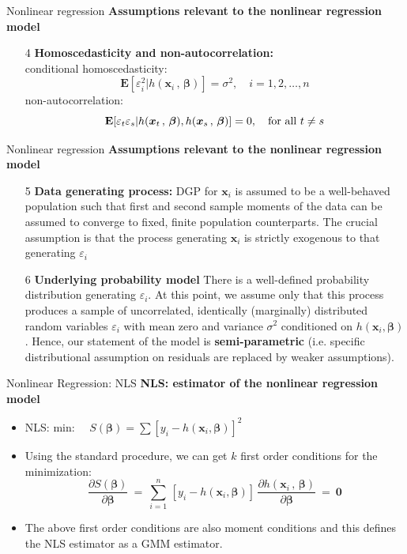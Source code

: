 \documentclass{beamer}
\begin{document}
\begin{frame}{Nonlinear regression}
\textbf{Assumptions relevant to the nonlinear regression model}\\
\medskip
\begin{itemize}
 \item[4] \textbf{Homoscedasticity and non-autocorrelation:}\\
 \medskip
 conditional homoscedasticity:
 $$
 \mathbf{E}[\varepsilon_i^2| h(\bm{x}_i\, , \,\bm{\beta})] = \sigma^2, \quad i=1,2,\dots,n
 $$
 non-autocorrelation:
 $$
 \mathbf{E}[\varepsilon_t\varepsilon_s| h(\bm{x}_t\, , \,\bm{\beta}), h(\bm{x}_s\, , \,\bm{\beta})] = 0, \quad \textnormal{for all~}t\neq s
 $$
\end{itemize}
\end{frame}
\begin{frame}{Nonlinear regression}
\textbf{Assumptions relevant to the nonlinear regression model}\\
\medskip
\begin{itemize}
\item[5] \textbf{Data generating process:} DGP for $\bm{x}_i$ is assumed to be a well-behaved population such that first and second sample moments of the data can be assumed to converge to fixed, finite population counterparts. The crucial assumption is that the process generating $\bm{x}_i$ is strictly exogenous to that generating $\varepsilon_i$
\item[6] \textbf{Underlying probability model} There is a well-defined probability distribution generating $\varepsilon_i$. At this point, we assume only that this process produces a sample of uncorrelated, identically (marginally) distributed random variables $\varepsilon_i$ with mean zero and variance $\sigma^2$ conditioned on $h(\bm{x}_i, \bm{\beta})$. Hence, our statement of the model is \textbf{semi-parametric} (i.e. specific distributional assumption on residuals are replaced by weaker assumptions).
\end{itemize}
\end{frame}
\begin{frame}{Nonlinear Regression: NLS}
\textbf{NLS: estimator of the nonlinear regression model}\\
\bigskip
\begin{itemize}
\item NLS: \qquad min:~~ $S(\bm{\beta})=\sum[y_i-h(\bm{x}_i, \bm{\beta})]^2$
\medskip
\item Using the standard procedure, we can get $k$ first order conditions for the minimization:
$$
\frac{\partial S(\bm{\beta})}{\partial \bm{\beta} } ~=~ 
\sum_{i=1}^n \, [y_i-h(\bm{x}_i, \bm{\beta})] \,
\frac{\partial h(\bm{x}_i\, , \,\bm{\beta})}{\partial \bm{\beta}}
~=~ \bm{0}
$$

\end{itemize}
\smallskip
\begin{itemize}
\item The above first order conditions are also moment conditions and this defines the NLS estimator as a GMM estimator.
\end{itemize}
\end{frame}
\end{document}

